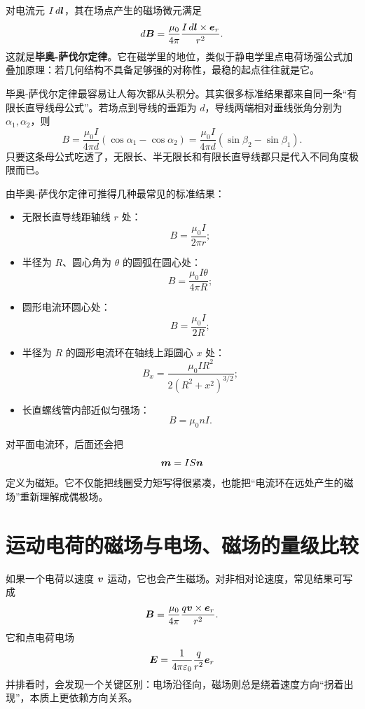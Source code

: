 \documentclass[lang=cn,11pt]{elegantbook}
\newcommand{\bridge}[1]{\begin{note}#1\end{note}}
\begin{document}
对电流元 \(I\,d\vb*{l}\)，其在场点产生的磁场微元满足
\[
d\vb*{B}
=\frac{\mu_0}{4\pi}\frac{I\,d\vb*{l}\times \vb*{e}_r}{r^2}.
\]
这就是\textbf{毕奥-萨伐尔定律}。它在磁学里的地位，类似于静电学里点电荷场强公式加叠加原理：若几何结构不具备足够强的对称性，最稳的起点往往就是它。

\bridge{毕奥-萨伐尔定律最容易让人每次都从头积分。其实很多标准结果都来自同一条“有限长直导线母公式”。若场点到导线的垂距为 \(d\)，导线两端相对垂线张角分别为 \(\alpha_1,\alpha_2\)，则
\[
B=\frac{\mu_0 I}{4\pi d}(\cos\alpha_1-\cos\alpha_2)
=\frac{\mu_0 I}{4\pi d}(\sin\beta_2-\sin\beta_1).
\]
只要这条母公式吃透了，无限长、半无限长和有限长直导线都只是代入不同角度极限而已。}

由毕奥-萨伐尔定律可推得几种最常见的标准结果：
\begin{itemize}
  \item 无限长直导线距轴线 \(r\) 处：
  \[
  B=\frac{\mu_0 I}{2\pi r};
  \]
  \item 半径为 \(R\)、圆心角为 \(\theta\) 的圆弧在圆心处：
  \[
  B=\frac{\mu_0 I\theta}{4\pi R};
  \]
  \item 圆形电流环圆心处：
  \[
  B=\frac{\mu_0 I}{2R};
  \]
  \item 半径为 \(R\) 的圆形电流环在轴线上距圆心 \(x\) 处：
  \[
  B_x=\frac{\mu_0 I R^2}{2(R^2+x^2)^{3/2}};
  \]
  \item 长直螺线管内部近似匀强场：
  \[
  B=\mu_0 n I.
  \]
\end{itemize}

对平面电流环，后面还会把
\[
\vb*{m}=IS\vb*{n}
\]
定义为磁矩。它不仅能把线圈受力矩写得很紧凑，也能把“电流环在远处产生的磁场”重新理解成偶极场。

\begin{center}
\end{center}

\section{运动电荷的磁场与电场、磁场的量级比较}

如果一个电荷以速度 \(\vb*{v}\) 运动，它也会产生磁场。对非相对论速度，常见结果可写成
\[
\vb*{B}
=\frac{\mu_0}{4\pi}\frac{q\vb*{v}\times \vb*{e}_r}{r^2}.
\]
它和点电荷电场
\[
\vb*{E}
=\frac{1}{4\pi\varepsilon_0}\frac{q}{r^2}\vb*{e}_r
\]
并排看时，会发现一个关键区别：电场沿径向，磁场则总是绕着速度方向“拐着出现”，本质上更依赖方向关系。
\end{document}
